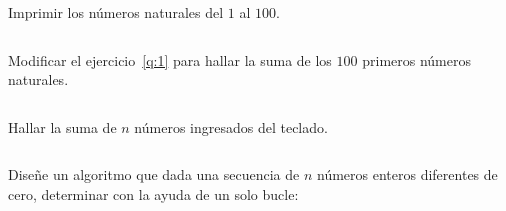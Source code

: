 \documentclass[spanish,addpoints,answers,a4paper]{exam}
\begin{document}
\begin{questions}

\question Imprimir los números naturales del $1$ al $100$.\label{q:1}

\begin{solution}
	\begin{listing}[H]
		\footnotesize
		\inputminted{cpp}{1_a.cc}
		\caption{Programa \texttt{1\textunderscore a.cc}.}
		\label{lst:3.1a}
	\end{listing}
\end{solution}

\question Modificar el ejercicio~\ref{q:1} para hallar la suma de los $100$ primeros números naturales.

\begin{solution}
	\begin{listing}[H]
		\footnotesize
		\inputminted{cpp}{2_a.cc}
		\caption{Programa \texttt{2\textunderscore a.cc}.}
		\label{lst:3.2a}
	\end{listing}
\end{solution}

\question Hallar la suma de $n$ números ingresados del teclado.

\begin{solution}
	\begin{listing}[H]
		\footnotesize
		\inputminted{cpp}{3_a.cc}
		\caption{Programa \texttt{3\textunderscore a.cc}.}
		\label{lst:3.3a}
	\end{listing}
\end{solution}

\question Diseñe un algoritmo que dada una secuencia de $n$ números enteros diferentes de cero, determinar con la ayuda de un solo bucle:


\end{questions}
\end{document}
